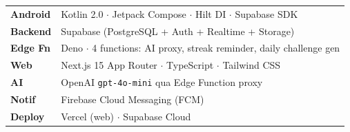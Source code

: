 \documentclass[11pt,a4paper]{article}
\begin{document}
\begin{tcbraster}[raster columns=2, raster column skip=4pt, raster row skip=4pt,
  raster equal height=rows]
\begin{tcolorbox}
\begin{tabular}{@{}p{2.8cm}p{5cm}@{}}
\small\textbf{Android} & \small Kotlin 2.0 $\cdot$ Jetpack Compose $\cdot$ Hilt DI $\cdot$ Supabase SDK \\[2pt]
\small\textbf{Backend} & \small Supabase (PostgreSQL + Auth + Realtime + Storage) \\[2pt]
\small\textbf{Edge Fn} & \small Deno $\cdot$ 4 functions: AI proxy, streak reminder, daily challenge gen \\[2pt]
\small\textbf{Web} & \small Next.js 15 App Router $\cdot$ TypeScript $\cdot$ Tailwind CSS \\[2pt]
\small\textbf{AI} & \small OpenAI \texttt{gpt-4o-mini} qua Edge Function proxy \\[2pt]
\small\textbf{Notif} & \small Firebase Cloud Messaging (FCM) \\[2pt]
\small\textbf{Deploy} & \small Vercel (web) $\cdot$ Supabase Cloud \\
\end{tabular}
\end{tcolorbox}

\end{tcbraster}

\vspace{4pt}
\end{document}
